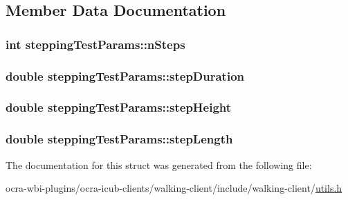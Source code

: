 \subsection{\-Member \-Data \-Documentation}
\hypertarget{structsteppingTestParams_aa3a8b8b10e589919331ac9123d9276dc}{
\subsubsection[{n\-Steps}]{\setlength{\rightskip}{0pt plus 5cm}int {\bf stepping\-Test\-Params\-::n\-Steps}}}\label{structsteppingTestParams_aa3a8b8b10e589919331ac9123d9276dc}
\hypertarget{structsteppingTestParams_ab713c909b480eb82d614340836639fa4}{
\subsubsection[{step\-Duration}]{\setlength{\rightskip}{0pt plus 5cm}double {\bf stepping\-Test\-Params\-::step\-Duration}}}\label{structsteppingTestParams_ab713c909b480eb82d614340836639fa4}
\hypertarget{structsteppingTestParams_aa40d952e16a8c4ea0c48983fbc3b95b2}{
\subsubsection[{step\-Height}]{\setlength{\rightskip}{0pt plus 5cm}double {\bf stepping\-Test\-Params\-::step\-Height}}}\label{structsteppingTestParams_aa40d952e16a8c4ea0c48983fbc3b95b2}
\hypertarget{structsteppingTestParams_aa20658768b31d91b09d9225d0fbf0df2}{
\subsubsection[{step\-Length}]{\setlength{\rightskip}{0pt plus 5cm}double {\bf stepping\-Test\-Params\-::step\-Length}}}\label{structsteppingTestParams_aa20658768b31d91b09d9225d0fbf0df2}


\-The documentation for this struct was generated from the following file\-:\begin{DoxyCompactItemize}
\item 
ocra-\/wbi-\/plugins/ocra-\/icub-\/clients/walking-\/client/include/walking-\/client/\hyperlink{utils_8h}{utils.\-h}\end{DoxyCompactItemize}
